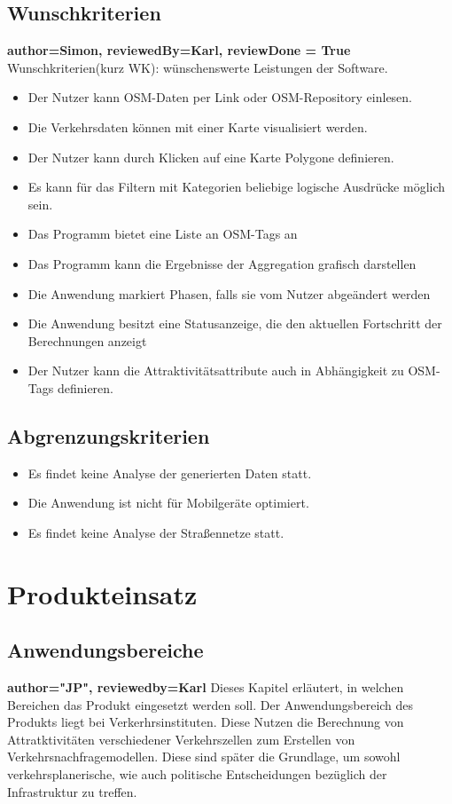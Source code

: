 \documentclass[parskip=full]{scrartcl} %
\begin{document}
\subsection{Wunschkriterien}
\textbf{author=Simon, reviewedBy=Karl, reviewDone = True\\}
Wunschkriterien(kurz WK): wünschenswerte Leistungen der Software.
\begin{itemize}
    \item <WK1> Der Nutzer kann OSM-Daten per Link oder OSM-Repository einlesen.
    \item <WK2> Die Verkehrsdaten können mit einer Karte visualisiert werden.
    \item <WK3> Der Nutzer kann durch Klicken auf eine Karte Polygone definieren.
    \item <WK4> Es kann für das Filtern mit Kategorien beliebige logische Ausdrücke möglich sein.
    \item <WK5> Das Programm bietet eine Liste an OSM-Tags an
    \item <WK6> Das Programm kann die Ergebnisse der Aggregation grafisch darstellen
    \item <WK7> Die Anwendung markiert Phasen, falls sie vom Nutzer abgeändert werden
    \item <WK8> Die Anwendung besitzt eine Statusanzeige, die den aktuellen Fortschritt der Berechnungen anzeigt
    \item <WK9> Der Nutzer kann die Attraktivitätsattribute auch in Abhängigkeit zu OSM-Tags definieren.
    
\end{itemize}

\subsection{Abgrenzungskriterien}
\begin{itemize}
    \item Es findet keine Analyse der generierten Daten statt.
    \item Die Anwendung ist nicht für Mobilgeräte optimiert.
    \item Es findet keine Analyse der Straßennetze statt.
\end{itemize}
\newpage

\section{Produkteinsatz}

\subsection{Anwendungsbereiche}
\textbf{author="JP", reviewedby=Karl} 
Dieses Kapitel erläutert, in welchen Bereichen das Produkt eingesetzt werden soll. Der Anwendungsbereich des Produkts liegt bei Verkerhrsinstituten. Diese Nutzen die Berechnung von Attratktivitäten verschiedener Verkehrszellen zum Erstellen von Verkehrsnachfragemodellen. Diese sind später die Grundlage, um sowohl verkehrsplanerische, wie auch politische Entscheidungen bezüglich der Infrastruktur zu treffen.
\end{document}
